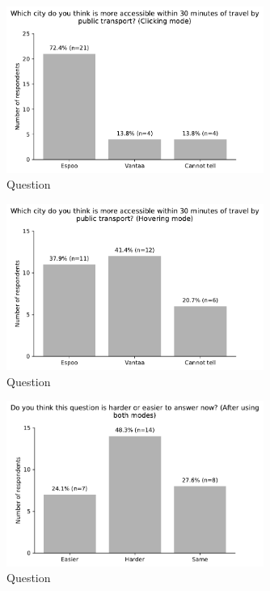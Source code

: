 \begin{figure}[H]
	\centering
	\includegraphics[width=0.75\textwidth]{images/questionnaire/2.pdf}
	\caption{Question}
	\label{fig:architechture}
\end{figure}

\begin{figure}[H]
	\centering
	\includegraphics[width=0.75\textwidth]{images/questionnaire/3.pdf}
	\caption{Question}
	\label{fig:architechture}
\end{figure}

\begin{figure}[H]
	\centering
	\includegraphics[width=0.75\textwidth]{images/questionnaire/4.pdf}
	\caption{Question}
	\label{fig:architechture}
\end{figure}

